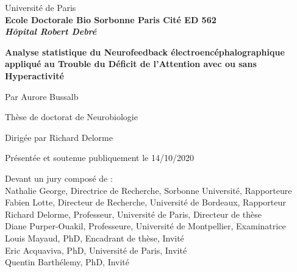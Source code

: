 
\begin{titlepage}

\vskip 1in

\begin{center}
{\LARGE Université de Paris} \\
\vskip 0in
\textbf{Ecole Doctorale Bio Sorbonne Paris Cité ED 562} \\
\vskip 0in
\textbf{\textit{Hôpital Robert Debré}} \\
\vskip 0.3in

\Huge \textbf{Analyse statistique du Neurofeedback électroencéphalographique appliqué au Trouble du Déficit de l'Attention avec ou sans Hyperactivité}

\vskip 0.3in

%

{\Large Par Aurore Bussalb} \\

\vskip 0.2in

{\large Thèse de doctorat de Neurobiologie} \\

\vskip 0.15in

{\large Dirigée par Richard Delorme} \\

\vskip 0.1in

{\normalsize Présentée et soutenue publiquement le 14/10/2020} \\
\end{center}
\vskip 0.20in

\noindent Devant un jury composé de : \\%
\noindent Nathalie George, Directrice de Recherche, Sorbonne Université, Rapporteure \\
\noindent Fabien Lotte, Directeur de Recherche, Université de Bordeaux, Rapporteur \\
\noindent Richard Delorme, Professeur, Université de Paris, Directeur de thèse \\
\noindent Diane Purper-Ouakil, Professeure, Université de Montpellier, Examinatrice \\
\noindent Louis Mayaud, PhD, Encadrant de thèse, Invité \\
\noindent Eric Acquaviva, PhD, Université de Paris, Invité \\
\noindent Quentin Barthélemy, PhD, Invité \\


\end{titlepage}
